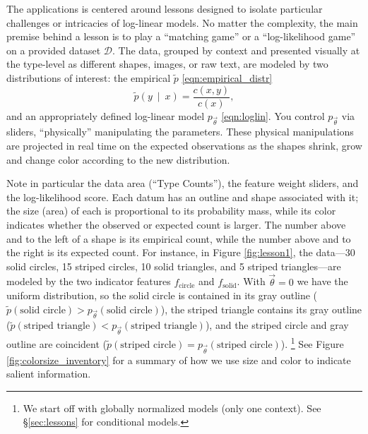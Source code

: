 \documentclass[11pt,letterpaper]{article}
\newcommand{\Note}[1]{}
\renewcommand{\Note}[1]{\hl{[#1]}}
\newcommand{\NoteSigned}[3]{{\sethlcolor{#2}\Note{#1: #3}}}
\newcommand{\NoteJE}[1]{\NoteSigned{JE}{LightGreen}{#1}}
\newcommand{\Commented}[1]{}
\newcommand{\empirical}[0]{\ensuremath{\tilde{p}}}
\newcommand{\Data}[0]{\ensuremath{\mathcal{D}}}
\begin{document}
The applications is centered around lessons designed to isolate particular 
challenges or intricacies of log-linear models. No matter the complexity, the main
premise behind a lesson is to play a ``matching
game'' or a ``log-likelihood game'' on a provided dataset \Data{}. The
data, grouped by context and presented visually at the type-level as
different shapes, images, or raw text, are modeled by two
distributions of interest: the empirical $\tilde{p}$
\eqref{eqn:empirical_distr}
\begin{equation}
\empirical\left(y\ \mid\ x\right) = \frac{c(x,y)}{c(x)},
\label{eqn:empirical_distr}
\end{equation} 
and an appropriately defined log-linear
model $p_{\vec{\theta}}$ \eqref{eqn:loglin}. You control $p_{\vec{\theta}}$ 
via sliders, ``physically'' manipulating the parameters. These physical 
manipulations are projected in real time on the expected observations as the 
shapes shrink, grow and change color according to the new distribution. 

\Commented{\NoteJE{I'd
  lead with this.  In fact, I think the text shown in Fig. 1 is
  extremely helpful for the reader to understand what this
  manipulative is all about, which is so far rather obscure even
  though we're well into the paper by now.  Maybe encourage the reader
  explicitly to read Fig. 1, and maybe enlarge it a bit (although the
  reader can zoom in if they're reading onscreen).  In the final
  version, you might be able to get a higher-res screenshot by zooming
  the browser (and using an appropriately large window); this gives a
  larger image and larger-font text, which you can shrink back again
  in the PDF.}  }

Note in particular the data area (``Type Counts''), the
feature weight sliders, and the log-likelihood score. 
Each datum has an outline and shape associated with it; the size (area) of
each is proportional to its probability mass, while its color
indicates whether the observed or expected count is larger.  The
number above and to the left of a shape is its empirical
count, while the number above and to the right is its expected count.
For instance, in Figure \ref{fig:lesson1}, the data---30 solid
circles, 15 striped circles, 10 solid triangles, and 5 striped
triangles---are modeled by the two indicator features
$f_{\textrm{circle}}$ and $f_{\textrm{solid}}$. With $\vec{\theta} =
0$ we have the uniform distribution, so the solid circle is contained
in its gray outline ($\empirical{}(\textrm{solid circle}) >
p_{\vec{\theta}}(\textrm{solid circle})$), the striped triangle
contains its gray outline ($\empirical{}(\textrm{striped triangle}) <
p_{\vec{\theta}}(\textrm{striped triangle})$), and the striped
circle and gray outline are coincident ($\empirical{}(\textrm{striped
  circle}) = p_{\vec{\theta}}(\textrm{striped circle})$).
\footnote{We start off with globally normalized models (only one 
context). See \S\ref{sec:lessons} for conditional models.}  
See Figure \ref{fig:colorsize_inventory}
for a summary of how we use size and color to indicate salient
information.
\end{document}
